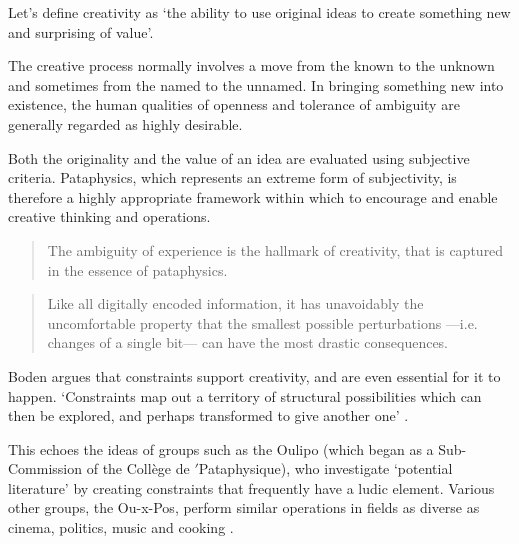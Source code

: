 Let's define creativity as `the ability to use original ideas to create something new and surprising of value'.

\begin{leftbar}
The creative process normally involves a move from the known to the unknown and sometimes from the named to the unnamed. In bringing something new into existence, the human qualities of openness and tolerance of ambiguity are generally regarded as highly desirable.
\end{leftbar}

\begin{leftbar}
Both the originality and the value of an idea are evaluated using subjective criteria. Pataphysics, which represents an extreme form of subjectivity, is therefore a highly appropriate framework within which to encourage and enable creative thinking and operations.
\end{leftbar}

\begin{quotation}
  The ambiguity of experience is the hallmark of creativity, that is captured in the essence of pataphysics. 
\end{quotation}

\begin{quotation}
  Like all digitally encoded information, it has unavoidably the uncomfortable property that the smallest possible perturbations —i.e. changes of a single bit— can have the most drastic consequences. 
\end{quotation}



\begin{leftbar}
Boden argues that constraints support creativity, and are even essential for it to happen. `Constraints map out a territory of structural possibilities which can then be explored, and perhaps transformed to give another one' \autocite[p.82]{Boden2003}.
\end{leftbar}

\begin{leftbar}
This echoes the ideas of groups such as the Oulipo (which began as a Sub-Commission of the Collège de $'$Pataphysique), who investigate `potential literature' by creating constraints that frequently have a ludic element. Various other groups, the Ou-x-Pos, perform similar operations in fields as diverse as cinema, politics, music and cooking \autocite{Motte2007}.
\end{leftbar}

